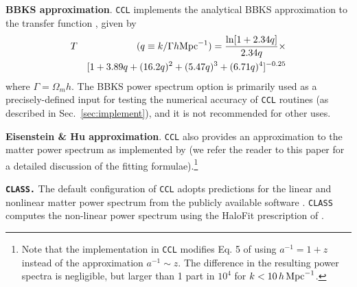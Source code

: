 \documentclass[\docopts]{\docclass}
\newcommand{\ccl}{{\tt CCL}\xspace}
\begin{document}
{\bf BBKS approximation}. \ccl implements the analytical BBKS approximation to the transfer function \citep{BBKS}, given by
\begin{eqnarray}
  \label{eq:bbks}
  T&&(q\equiv k/\Gamma h {\rm Mpc}^{-1}) = \frac{\ln[1+2.34q]}{2.34q}\times\\
  &&[1+3.89q+(16.2q)^2+(5.47q)^3+(6.71q)^4]^{-0.25}\nonumber
\end{eqnarray}
where $\Gamma = \Omega_m h$. The BBKS power spectrum option is primarily used as a precisely-defined input for testing the numerical accuracy of \ccl routines (as described in Sec.~\ref{sec:implement}),
and it is not recommended for other uses.

{\bf Eisenstein \& Hu approximation}. \ccl also provides an approximation to the matter power spectrum as implemented by \citet{1998ApJ...496..605E} (we refer the reader to this paper for a detailed discussion of the fitting formulae).\footnote{Note that the implementation in \ccl modifies Eq. 5 of \citet{1998ApJ...496..605E} using $a^{-1}=1+z$ instead of the approximation $a^{-1}\sim z$. The difference in the resulting power spectra is negligible, but larger than 1 part in $10^4$ for $k<10\,h\,{\rm Mpc}^{-1}$.}

{\bf \tt CLASS.} The default configuration of \ccl adopts predictions for the linear and nonlinear matter power spectrum from the publicly available software \citep{class}. {\tt CLASS} computes the non-linear power spectrum using the HaloFit prescription of \cite{CLASS_halofit}.
\end{document}
